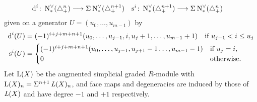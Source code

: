 \begin{align*}
	\operatorname{d}^i\colon \operatorname{N}^\vee_{*}(\triangle_{+}^n) &\longrightarrow \Sigma^{}\operatorname{N}^\vee_{*}(\triangle_{+}^{n+1}) 
	&
	\operatorname{s}^i\colon \operatorname{N}^\vee_{*}(\triangle_{+}^{n+1}) &\longrightarrow \Sigma^{}\operatorname{N}^\vee_{*}(\triangle_{+}^n) 
\end{align*}
given on a generator $U=(u_0,\ldots,u_{m-1})$ by
\begin{align*}
	\operatorname{d}^i(U) &=
	(-1)^{i+j+m+n+1}(u_0,\ldots,u_{j-1},i,u_{j}+1,\ldots,u_{m-1}+1)
	\quad \text{if $u_{j-1}<i \leq u_{j}$}
	\\
	\operatorname{s}^i(U) &= \begin{cases}
	(-1)^{i+j+m+n+1}(u_0,\ldots,u_{j-1},u_{j+1}-1\ldots,u_{m-1}-1) 	& \text{if $u_{j} = i$,}
	\\
	0 & \text{otherwise.}
	\end{cases}
\end{align*}
 Let $\operatorname{L}(X)$ be the augmented simplicial graded $R$-module with $\operatorname{L}(X)_n = \Sigma^{n+1}\operatorname{{\it L}}(X)_{n}$, and face maps and degeneracies are induced by those of $\operatorname{{\it L}}(X)$ and have degree $-1$ and $+1$ respectively. 

